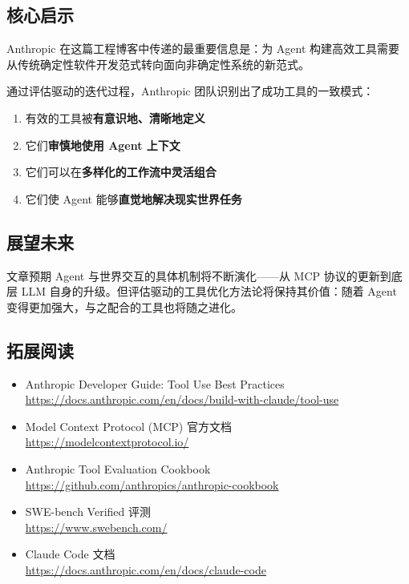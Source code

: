 \documentclass[a4paper]{article}
\begin{document}
\subsection{核心启示}

Anthropic 在这篇工程博客中传递的最重要信息是：为 Agent 构建高效工具需要从传统确定性软件开发范式转向面向非确定性系统的新范式。

通过评估驱动的迭代过程，Anthropic 团队识别出了成功工具的一致模式：

\begin{enumerate}[leftmargin=1.5em]
    \item 有效的工具被\textbf{有意识地、清晰地定义}
    \item 它们\textbf{审慎地使用 Agent 上下文}
    \item 它们可以在\textbf{多样化的工作流中灵活组合}
    \item 它们使 Agent 能够\textbf{直觉地解决现实世界任务}
\end{enumerate}

\subsection{展望未来}

文章预期 Agent 与世界交互的具体机制将不断演化——从 MCP 协议的更新到底层 LLM 自身的升级。但评估驱动的工具优化方法论将保持其价值：随着 Agent 变得更加强大，与之配合的工具也将随之进化。

\subsection{拓展阅读}

\begin{itemize}[leftmargin=1.5em]
    \item Anthropic Developer Guide: Tool Use Best Practices\\ \url{https://docs.anthropic.com/en/docs/build-with-claude/tool-use}
    \item Model Context Protocol (MCP) 官方文档\\ \url{https://modelcontextprotocol.io/}
    \item Anthropic Tool Evaluation Cookbook\\ \url{https://github.com/anthropics/anthropic-cookbook}
    \item SWE-bench Verified 评测\\ \url{https://www.swebench.com/}
    \item Claude Code 文档\\ \url{https://docs.anthropic.com/en/docs/claude-code}
\end{itemize}

\end{document}
